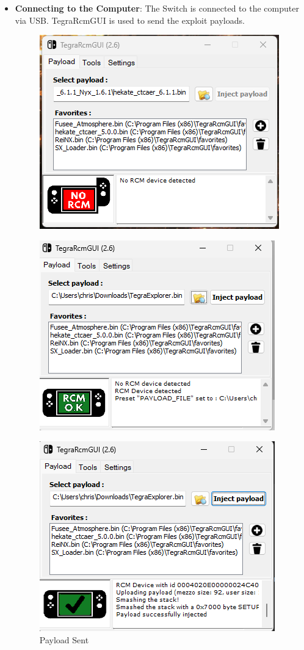 \begin{itemize}
    \item \textbf{Connecting to the Computer}: The Switch is connected to the computer via USB. TegraRcmGUI is used to send the exploit payloads.

    \begin{figure}[H]
         \centering
         \begin{minipage}{.4\textwidth}
              \centering
              \includegraphics[width=.8\linewidth]{images/no_rcm.png}
              \label{fig:no_rcm}
         \end{minipage}%
         \begin{minipage}{.4\textwidth}
              \centering
              \includegraphics[width=.8\linewidth]{images/yes_rcm.png}
              \label{fig:rcm_detected}
         \end{minipage}%
    \end{figure}
    \begin{figure}[H]
        \centering
        \includegraphics[width=.3\linewidth]{images/payload_sent.png}
        \caption{Payload Sent}
        \label{fig:payload_sent}
   \end{figure}


\end{itemize}
